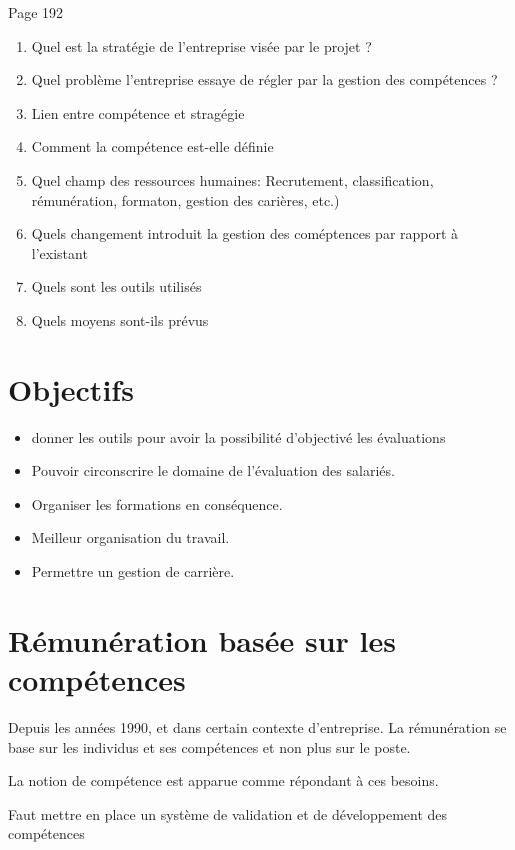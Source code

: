 Page 192
\begin{enumerate}
    \item Quel est la stratégie de l'entreprise visée par le projet ?
    \item Quel problème l'entreprise essaye de régler par la gestion des compétences ?
    \item Lien entre compétence et stragégie 
    \item Comment la compétence est-elle définie
    \item Quel champ des ressources humaines: Recrutement, classification, rémunération, formaton, gestion des carières, etc.)
    \item Quels changement introduit la gestion des coméptences par rapport à l'existant
    \item Quels sont les outils utilisés
    \item Quels moyens sont-ils prévus  
\end{enumerate}


\section{Objectifs}
\begin{itemize}
    \item donner les outils pour avoir la possibilité d'objectivé les évaluations
    \item Pouvoir circonscrire le domaine de l'évaluation des salariés. 
    \item Organiser les formations en conséquence. 
    \item Meilleur organisation du travail. 
    \item Permettre un gestion de carrière. 
\end{itemize}

\section{Rémunération basée sur les compétences} \cite{gestionressourceshumaine2007}
Depuis les années 1990, et dans certain contexte d'entreprise. La rémunération se base sur les individus et ses compétences et non plus sur le poste. 

La notion de compétence est apparue comme répondant à ces besoins. 

Faut mettre en place un système de validation et de développement des compétences

